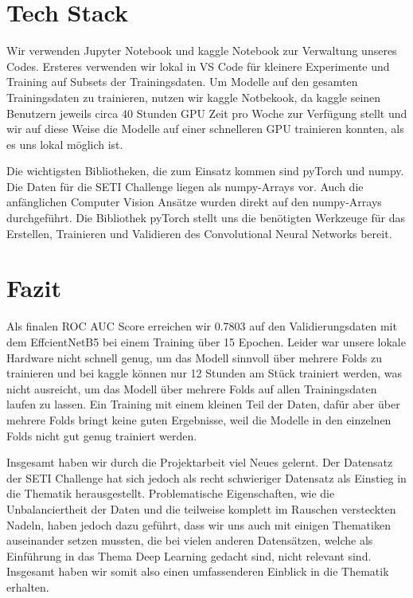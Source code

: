 \documentclass[12pt, a4paper]{article}
\begin{document}
\section{Tech Stack}
Wir verwenden Jupyter Notebook und kaggle Notebook zur Verwaltung unseres Codes. Ersteres verwenden wir lokal in VS Code für kleinere Experimente und Training auf Subsets der Trainingsdaten. Um Modelle auf den gesamten Trainingsdaten zu trainieren, nutzen wir kaggle Notbekook, da kaggle seinen Benutzern jeweils circa 40 Stunden GPU Zeit pro Woche zur Verfügung stellt und wir auf diese Weise die Modelle auf einer schnelleren GPU trainieren konnten, als es uns lokal möglich ist.

Die wichtigsten Bibliotheken, die zum Einsatz kommen sind pyTorch und numpy. Die Daten für die SETI Challenge liegen als numpy-Arrays vor. Auch die anfänglichen Computer Vision Ansätze wurden direkt auf den numpy-Arrays durchgeführt. Die Bibliothek pyTorch stellt uns die benötigten Werkzeuge für das Erstellen, Trainieren und Validieren des Convolutional Neural Networks bereit.

\section{Fazit}
Als finalen ROC AUC Score erreichen wir 0.7803 auf den Validierungsdaten mit dem EffcientNetB5 bei einem Training über 15 Epochen. Leider war unsere lokale Hardware nicht schnell genug, um das Modell sinnvoll über mehrere Folds zu trainieren und bei kaggle können nur 12 Stunden am Stück trainiert werden, was nicht ausreicht, um das Modell über mehrere Folds auf allen Trainingsdaten laufen zu lassen. Ein Training mit einem kleinen Teil der Daten, dafür aber über mehrere Folds bringt keine guten Ergebnisse, weil die Modelle in den einzelnen Folds nicht gut genug trainiert werden.

Insgesamt haben wir durch die Projektarbeit viel Neues gelernt. Der Datensatz der SETI Challenge hat sich jedoch als recht schwieriger Datensatz als Einstieg in die Thematik herausgestellt. Problematische Eigenschaften, wie die Unbalanciertheit der Daten und die teilweise komplett im Rauschen versteckten Nadeln, haben jedoch dazu geführt, dass wir uns auch mit einigen Thematiken auseinander setzen mussten, die bei vielen anderen Datensätzen, welche als Einführung in das Thema Deep Learning gedacht sind, nicht relevant sind. Insgesamt haben wir somit also einen umfassenderen Einblick in die Thematik erhalten.

\newpage


\end{document}
